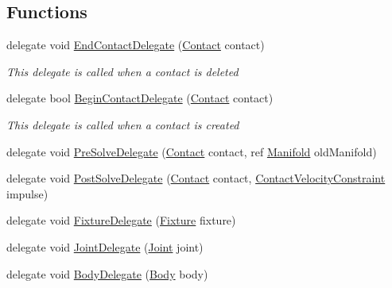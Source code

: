 \subsection*{Functions}
\begin{DoxyCompactItemize}
\item 
delegate void \hyperlink{namespace_farseer_physics_1_1_dynamics_a9f14bccf84c77834b2365a50815aaad2}{End\+Contact\+Delegate} (\hyperlink{class_farseer_physics_1_1_dynamics_1_1_contacts_1_1_contact}{Contact} contact)
\begin{DoxyCompactList}\small\item\em This delegate is called when a contact is deleted \end{DoxyCompactList}\item 
delegate bool \hyperlink{namespace_farseer_physics_1_1_dynamics_a99b82c4cad7efb4a314b7683e1e5b9f5}{Begin\+Contact\+Delegate} (\hyperlink{class_farseer_physics_1_1_dynamics_1_1_contacts_1_1_contact}{Contact} contact)
\begin{DoxyCompactList}\small\item\em This delegate is called when a contact is created \end{DoxyCompactList}\item 
delegate void \hyperlink{namespace_farseer_physics_1_1_dynamics_aae28b8226bebdf50920ba4950f4dc0ca}{Pre\+Solve\+Delegate} (\hyperlink{class_farseer_physics_1_1_dynamics_1_1_contacts_1_1_contact}{Contact} contact, ref \hyperlink{struct_farseer_physics_1_1_collision_1_1_manifold}{Manifold} old\+Manifold)
\item 
delegate void \hyperlink{namespace_farseer_physics_1_1_dynamics_ab059675aeb57a622f51aeb9cb2d05a14}{Post\+Solve\+Delegate} (\hyperlink{class_farseer_physics_1_1_dynamics_1_1_contacts_1_1_contact}{Contact} contact, \hyperlink{class_farseer_physics_1_1_dynamics_1_1_contacts_1_1_contact_velocity_constraint}{Contact\+Velocity\+Constraint} impulse)
\item 
delegate void \hyperlink{namespace_farseer_physics_1_1_dynamics_a4b415cdd212573683a0002ac70b38c53}{Fixture\+Delegate} (\hyperlink{class_farseer_physics_1_1_dynamics_1_1_fixture}{Fixture} fixture)
\item 
delegate void \hyperlink{namespace_farseer_physics_1_1_dynamics_a9da8e70b5e8c9bde4473fcf8e47d0fb1}{Joint\+Delegate} (\hyperlink{class_farseer_physics_1_1_dynamics_1_1_joints_1_1_joint}{Joint} joint)
\item 
delegate void \hyperlink{namespace_farseer_physics_1_1_dynamics_af77daabe9aac262e951d74f86d6c54dc}{Body\+Delegate} (\hyperlink{class_farseer_physics_1_1_dynamics_1_1_body}{Body} body)

\end{DoxyCompactItemize}
